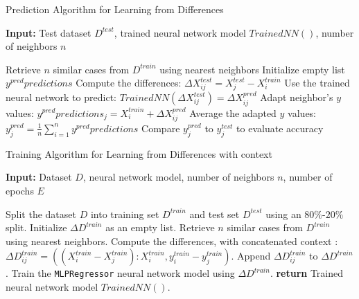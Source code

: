 \documentclass[a4paper, 12pt]{report}
\begin{document}
\begin{algorithm}
	\caption{Prediction Algorithm for Learning from Differences}
	\label{alg:learning_from_differences_predict_alg2}

	\textbf{Input:} Test dataset $D^{test}$, trained neural network model $Trained NN()$, number of neighbors $n$
	\begin{algorithmic}
            \State Retrieve $n$ similar cases from $D^{train}$ using nearest neighbors
			\State Initialize empty list $y^{pred}predictions$
                \State Compute the differences: $\Delta X^{test}_{ij} = X^{test}_j - X^{train}_i$
                \State Use the trained neural network to predict: $Trained NN(\Delta X^{test}_{ij}) = {\Delta X^{pred}_{ij}}$
                \State Adapt neighbor's $y$ values: $y^{pred}predictions_j = X^{train}_i + \Delta X^{pred}_{ij}$
            \EndFor
            \State Average the adapted $y$ values: $y^{pred}_j = \frac{1}{n} \sum_{i=1}^{n} y^{pred}predictions$
			\State Compare $y^{pred}_j$ to $y^{test}_j$ to evaluate accuracy
        \EndFor
    \end{algorithmic}
\end{algorithm}

\begin{algorithm}
	\caption{Training Algorithm for Learning from Differences with context}
	\label{alg:learning_from_differences_variant_train_alg3}

	\textbf{Input:} Dataset $D$, neural network model, number of neighbors $n$, number of epochs $E$

	\begin{algorithmic}[1]
        \State Split the dataset $D$ into training set $D^{train}$ and test set $D^{test}$ using an $80\%$-$20\%$ split.
        \State Initialize $\Delta D^{train}$ as an empty list.
            \State Retrieve $n$ similar cases from $D^{train}$ using nearest neighbors.
                \State Compute the differences, with concatenated context : $\Delta D^{train}_{ij} = ((X^{train}_i - X^{train}_j):X^{train}_i, y^{train}_i - y^{train}_j)$.
                \State Append $\Delta D^{train}_{ij}$ to $\Delta D^{train}$.
            \EndFor
        \EndFor
        \State Train the \texttt{MLPRegressor} neural network model using $\Delta D^{train}$.
        \State \textbf{return} Trained neural network model $Trained NN()$.
    \end{algorithmic}
\end{algorithm}
\end{document}
